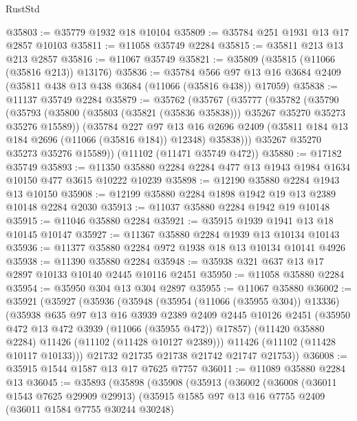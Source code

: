 \begin{lexlean}{RustStd}
\begin{coremodule}
@35803 := @35779 @1932 @18 @10104
@35809 := @35784 @251 @1931 @13 @17 @2857 @10103
@35811 := @11058 @35749 @2284
@35815 := @35811 @213 @13 @213 @2857
@35816 := @11067 @35749
@35821 := @35809 (@35815 (@11066 (@35816 @213)) @13176)
@35836 := @35784
    @566
    @97
    @13
    @16
    @3684
    @2409
    (@35811 @438 @13 @438 @3684 (@11066 (@35816 @438)) @17059)
@35838 := @11137 @35749 @2284
@35879 := @35762
    (@35767
      (@35777
        (@35782
          (@35790
            (@35793 (@35800 (@35803 (@35821 (@35836 @35838))) @35267 @35270 @35273 @35276 @15589))
            (@35784
              @227
              @97
              @13
              @16
              @2696
              @2409
              (@35811 @184 @13 @184 @2696 (@11066 (@35816 @184)) @12348)
              @35838)))
        @35267
        @35270
        @35273
        @35276
        @15589))
    (@11102 (@11471 @35749 @472))
@35880 := @17182 @35749
@35893 := @11350 @35880 @2284 @2284 @477 @13 @1943 @1984 @1634 @10150 @477 @3615 @10222 @10239
@35898 := @12190 @35880 @2284 @1943 @13 @10150
@35908 := @12199 @35880 @2284 @1898 @1942 @19 @13 @2389 @10148 @2284 @2030
@35913 := @11037 @35880 @2284 @1942 @19 @10148
@35915 := @11046 @35880 @2284
@35921 := @35915 @1939 @1941 @13 @18 @10145 @10147
@35927 := @11367 @35880 @2284 @1939 @13 @10134 @10143
@35936 := @11377 @35880 @2284 @972 @1938 @18 @13 @10134 @10141 @4926
@35938 := @11390 @35880 @2284
@35948 := @35938 @321 @637 @13 @17 @2897 @10133 @10140 @2445 @10116 @2451
@35950 := @11058 @35880 @2284
@35954 := @35950 @304 @13 @304 @2897
@35955 := @11067 @35880
@36002 := @35921
    (@35927
      (@35936
        (@35948
          (@35954 (@11066 (@35955 @304)) @13336)
          (@35938
            @635
            @97
            @13
            @16
            @3939
            @2389
            @2409
            @2445
            @10126
            @2451
            (@35950 @472 @13 @472 @3939 (@11066 (@35955 @472)) @17857)
            (@11420 @35880 @2284)
            @11426
            (@11102 (@11428 @10127 @2389)))
          @11426
          (@11102 (@11428 @10117 @10133)))
        @21732
        @21735
        @21738
        @21742
        @21747
        @21753))
@36008 := @35915 @1544 @1587 @13 @17 @7625 @7757
@36011 := @11089 @35880 @2284 @13
@36045 := @35893
    (@35898
      (@35908
        (@35913
          (@36002
            (@36008
              (@36011 @1543 @7625 @29909 @29913)
              (@35915
                @1585
                @97
                @13
                @16
                @7755
                @2409
                (@36011 @1584 @7755 @30244 @30248)

\end{coremodule}
\end{lexlean}
